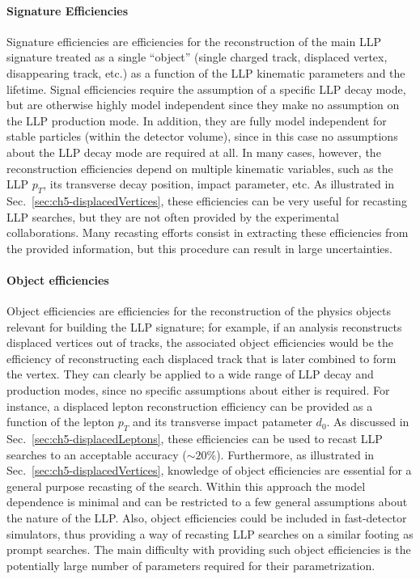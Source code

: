 \paragraph{Signature Efficiencies} Signature efficiencies are efficiencies for the reconstruction of the
main LLP signature treated as a single ``object'' (single charged track, displaced vertex, disappearing
track, etc.) as a function of the LLP kinematic parameters and
the lifetime.
Signal efficiencies require the assumption of a specific LLP decay mode, but
are otherwise highly model independent since they make no assumption on the LLP
production mode.
In addition, they are fully model independent for stable particles
(within the detector volume), since in this case no assumptions about
the LLP decay mode are required at all.
In many cases, however, the reconstruction efficiencies depend on multiple
kinematic variables, such as the LLP $p_T$, its transverse decay position, impact
parameter, etc.
As illustrated in Sec.~\ref{sec:ch5-displacedVertices}, these efficiencies
can be very useful for recasting LLP searches, but  they
are not often provided by the experimental collaborations. Many recasting efforts consist in
extracting these efficiencies from the provided information, but
this procedure can result in large uncertainties.

\paragraph{Object efficiencies} Object efficiencies are efficiencies for the reconstruction of
the physics objects relevant for building the LLP signature; for example, if an analysis
reconstructs displaced vertices out of tracks, the associated object efficiencies would be
the efficiency of reconstructing each displaced track that is later combined to form the vertex.
They can clearly be applied to a wide range of LLP
decay and production modes, since no specific assumptions about either is
required.
For instance, a displaced lepton reconstruction efficiency can be provided
as a function of the lepton $p_T$ and its transverse impact patameter $d_{0}$.
As discussed in Sec.~\ref{sec:ch5-displacedLeptons}, these efficiencies
can be used to recast LLP searches to an acceptable accuracy ($\sim 20\%$).
Furthermore, as illustrated in Sec.~\ref{sec:ch5-displacedVertices},
knowledge of object efficiencies are essential for a general purpose
recasting of the search.
Within this approach the model dependence is minimal and can be
restricted to a few general assumptions about the nature of the LLP.
Also, object efficiencies could be included in fast-detector simulators, thus providing a way of recasting LLP searches
on a similar footing as prompt searches.
The main difficulty with providing such object efficiencies is
the potentially large number of parameters required for their parametrization.

